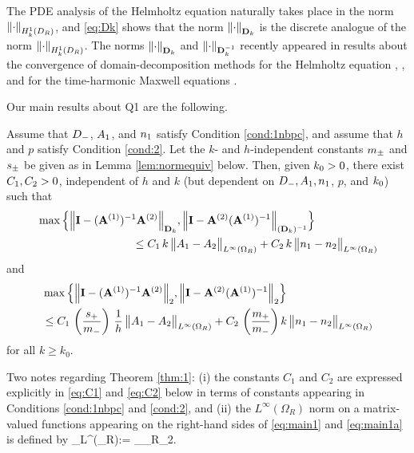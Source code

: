 The PDE analysis of the Helmholtz equation naturally takes place in the norm $\NHokDR{\cdot}$, and \eqref{eq:Dk} shows that the norm $\NDmatk{\cdot}$ is
the discrete analogue of the norm $\NHokDR{\cdot}$. %
The norms $\NDmatk{\cdot}$ and $\NDmatkI{\cdot}$ recently appeared in results about the convergence of domain-decomposition methods %
for the Helmholtz equation \cite{GrSpVa:17}, \cite{GrSpZo:18}, and for the time-harmonic Maxwell equations \cite{BoDoGrSpTo:17}. 

Our main results about Q1 are the following.

\begin{theorem}\label{thm:1}
Assume that $D_{-}$, $A_{1}$, and $n_{1}$ satisfy Condition \ref{cond:1nbpc}, and assume that $h$ and $p$ satisfy Condition \ref{cond:2}. 
Let the $k$- and $h$-independent constants $m_{\pm}$ and $s_{\pm}$ be given as in Lemma \ref{lem:normequiv} below.
Then, given $k_{0}>0$, there exist $C_{1}, C_{2}>0$, independent of $h$ and $k$ (but dependent on $D_{-}, A_{1}, n_{1}$, $p$, and $k_{0}$) such that
\begin{align}\nonumber
&\max\Big\{
\NDmatk{\Imat - (\Amat^{(1)})^{-1}\Amat^{(2)}}, 
\N{\Imat -\Amat^{(2)} (\Amat^{(1)})^{-1}}_{(\Dmat_k)^{-1}}
\Big\}\\
&\hspace{3cm} 
\leq C_1 \,k \,
\big\|\Ao-\At\big\|_{L^\infty(\Omega_R)} + C_2 \, k \, \big\|\no-\nt\big\|_{L^\infty(\Omega_R)}
\label{eq:main1}
\end{align}
and 
\begin{align}\nonumber
&\max\Big\{
\N{\Imat - (\Amat^{(1)})^{-1}\Amat^{(2)}}_2, 
\N{\Imat -\Amat^{(2)} (\Amat^{(1)})^{-1}}_2
\Big\}\\
&\hspace{0cm} 
\leq C_1 \,\left(\frac{s_+}{m_-}\right) \,\frac{1}{h} \,
\big\|\Ao-\At\big\|_{L^\infty(\Omega_R)} + C_2 \, \left(\frac{m_+}{m_-} \right)k \, \big\|\no-\nt\big\|_{L^\infty(\Omega_R)}
\label{eq:main1a}
\end{align}
for all $k\geq k_0$. 
\end{theorem}

Two notes regarding Theorem \ref{thm:1}: (i) the constants $C_1$ and $C_2$ are expressed explicitly in \eqref{eq:C1} and \eqref{eq:C2} below in terms of constants appearing in Conditions \ref{cond:1nbpc} and \ref{cond:2}, and (ii) the $L^\infty(\Omega_R)$ norm on a matrix-valued functions appearing on the right-hand sides of \eqref{eq:main1} and \eqref{eq:main1a} is defined by
\beqs
{}_{L^\infty(\Omega_R)}:= \esssup_{\bx\in\Omega_R}_2.
\eeqs

